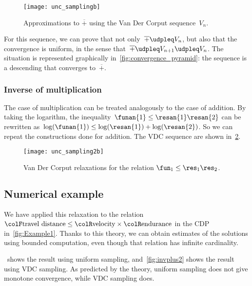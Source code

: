 \begin{figure}[h]
    \centering
    \texttt{[image: unc\_samplingb]}
    \caption{
        Approximations to $\overline{+}$ using the Van Der Corput sequence~$V_{n}$.
    }
    \label{fig:Vn}
\end{figure}

For this sequence, we can prove that not only~$\overline{+}\udpleq V_{n}$, but also that the convergence is uniform, in the sense that~$\overline{+}\udpleq V_{n+1}\udpleq V_{n}$.
The situation is represented graphically in~\cref{fig:convergence_pyramid}: the sequence is a descending  that converges to~$\overline{+}$.

\subsubsection{Inverse of multiplication}

The case of multiplication can be treated analogously to the case of addition.
By taking the logarithm, the inequality~$\funan{1}\leq\resan{1}\resan{2}$ can be rewritten as~$\log(\funan{1})\leq\log(\resan{1})+\log(\resan{2})$.
So we can repeat the constructions done for addition.
The VDC sequence are shown in~\cref{fig:approx_invmult}.

\begin{figure}[h]
    \centering
    \texttt{[image: unc\_sampling2b]}
    \caption{
        Van Der Corput relaxations for the relation $\fun_{1}\leq\res_{1}\res_{2}$.}
    \label{fig:approx_invmult}
\end{figure}

\subsection{Numerical example}

We have applied this relaxation to the relation ${\colF\text{travel distance}}\leq{\colR\text{velocity}}\times{\colR\text{endurance}}$ in the CDP in~\cref{fig:Example1}.
Thanks to this theory, we can obtain estimates of the solutions using bounded computation, even though that relation has infinite cardinality.

~shows the result using uniform sampling, and~\cref{fig:invplus2} shows the result using VDC sampling.
As predicted by the theory, uniform sampling does not give monotone convergence, while VDC sampling does.
\vfill

